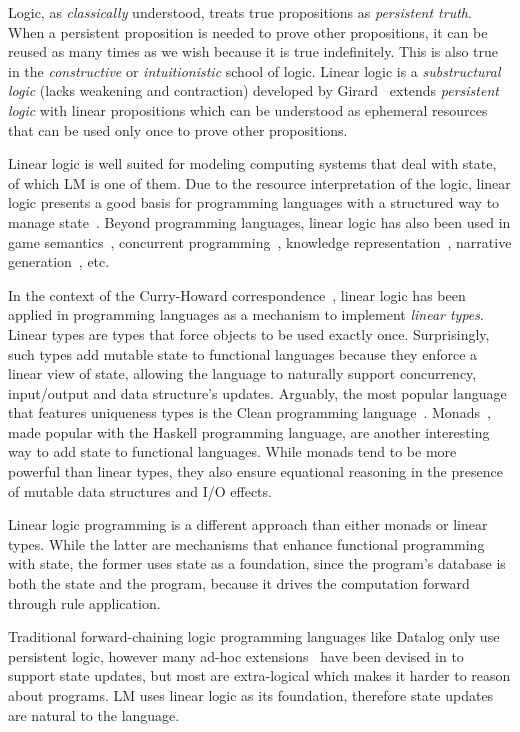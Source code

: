 Logic, as \emph{classically} understood, treats true propositions as
\emph{persistent truth}. When a persistent proposition is needed to prove other
propositions, it can be reused as many times as we wish because it is true
indefinitely. This is also true in the \emph{constructive} or
\emph{intuitionistic} school of logic.  Linear logic is a \emph{substructural
logic} (lacks weakening and contraction) developed by
Girard~\cite{Girard95logic:its} extends \emph{persistent logic} with linear
propositions which can be understood as ephemeral resources that can be used
only once to prove other propositions.

Linear logic is well suited for modeling computing systems that deal with state,
of which LM is one of them.  Due to the resource interpretation of the logic,
linear logic presents a good basis for programming languages with a structured
way to manage state~\cite{Miller85anoverview}. Beyond programming languages,
linear logic has also been used in game
semantics~\cite{lafont1991games,blass1992game}, concurrent
programming~\cite{lopez2005monadic,mazurak2010lolliproc,perez-2012}, knowledge
representation~\cite{bos2011survey}, narrative
generation~\cite{chris-int7,martens2013linear}, etc.

In the context of the Curry-Howard correspondence~\cite{howard:tfatnoc}, linear
logic has been applied in programming languages as a mechanism to implement
\emph{linear types}. Linear types are types that force objects to be used
exactly once. Surprisingly, such types add mutable state to functional languages
because they enforce a linear view of state, allowing the language to naturally
support concurrency, input/output and data structure's updates.  Arguably, the
most popular language that features uniqueness types is the Clean programming
language~\cite{JFP:1349748}.  Monads~\cite{Wadler:1997:DI:262009.262011}, made
popular with the Haskell programming language, are another interesting way to
add state to functional languages. While monads tend to be more powerful than
linear types, they also ensure equational reasoning in the presence of mutable
data structures and I/O effects.

Linear logic programming is a different approach than either monads or linear
types.  While the latter are mechanisms that enhance functional programming with
state, the former uses state as a foundation, since the program's database is
both the state and the program, because it drives the computation forward
through rule application.

Traditional forward-chaining logic programming languages like
Datalog only use persistent logic, however many ad-hoc
extensions~\cite{Liu98extendingdatalog,Ludascher95alogical} have been devised
in to support state updates, but most are extra-logical which makes it harder
to reason about programs. LM uses linear logic as its foundation, therefore
state updates are natural to the language.

